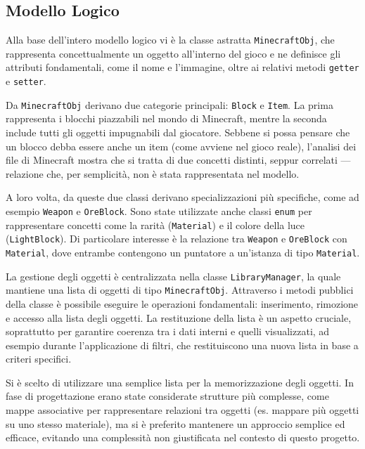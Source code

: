 \documentclass[a4paper,12pt]{article}
\begin{document}
\subsection{Modello Logico}

Alla base dell'intero modello logico vi è la classe astratta \texttt{MinecraftObj}, che rappresenta concettualmente un oggetto all’interno del gioco e ne definisce gli attributi fondamentali, come il nome e l’immagine, oltre ai relativi metodi \texttt{getter} e \texttt{setter}.

Da \texttt{MinecraftObj} derivano due categorie principali: \texttt{Block} e \texttt{Item}.  
La prima rappresenta i blocchi piazzabili nel mondo di Minecraft, mentre la seconda include tutti gli oggetti impugnabili dal giocatore.  
Sebbene si possa pensare che un blocco debba essere anche un item (come avviene nel gioco reale), l’analisi dei file di Minecraft mostra che si tratta di due concetti distinti, seppur correlati — relazione che, per semplicità, non è stata rappresentata nel modello.

A loro volta, da queste due classi derivano specializzazioni più specifiche, come ad esempio \texttt{Weapon} e \texttt{OreBlock}.  
Sono state utilizzate anche classi \texttt{enum} per rappresentare concetti come la rarità (\texttt{Material}) e il colore della luce (\texttt{LightBlock}).  
Di particolare interesse è la relazione tra \texttt{Weapon} e \texttt{OreBlock} con \texttt{Material}, dove entrambe contengono un puntatore a un’istanza di tipo \texttt{Material}.

La gestione degli oggetti è centralizzata nella classe \texttt{LibraryManager}, la quale mantiene una lista di oggetti di tipo \texttt{MinecraftObj}.  
Attraverso i metodi pubblici della classe è possibile eseguire le operazioni fondamentali: inserimento, rimozione e accesso alla lista degli oggetti.  
La restituzione della lista è un aspetto cruciale, soprattutto per garantire coerenza tra i dati interni e quelli visualizzati, ad esempio durante l'applicazione di filtri, che restituiscono una nuova lista in base a criteri specifici.

Si è scelto di utilizzare una semplice lista per la memorizzazione degli oggetti. In fase di progettazione erano state considerate strutture più complesse, come mappe associative per rappresentare relazioni tra oggetti (es. mappare più oggetti su uno stesso materiale), ma si è preferito mantenere un approccio semplice ed efficace, evitando una complessità non giustificata nel contesto di questo progetto.
\end{document}

